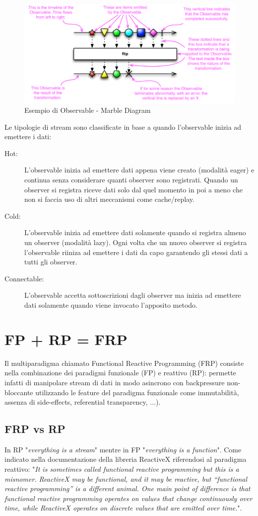 \documentclass[../main.tex]{subfiles}
\begin{document}
\begin{figure}[H]
\centering
\includegraphics[width=1\textwidth]{img/observable1.png}
\caption{Esempio di Observable - Marble Diagram}
\end{figure}

Le tipologie di stream sono classificate in base a quando l'observable inizia ad emettere i dati:
\begin{description}
    \item[Hot:] L'observable inizia ad emettere dati appena viene creato (modalità eager) e continua senza considerare quanti observer sono registrati. Quando un observer si registra riceve dati solo dal quel momento in poi a meno che non si faccia uso di altri meccanismi come cache/replay.
    \item[Cold:] L'observable inizia ad emettere dati solamente quando si registra almeno un observer (modalità lazy). Ogni volta che un nuovo observer si registra l'observable riiniza ad emettere i dati da capo garantendo gli stessi dati a tutti gli observer.
    \item[Connectable:] L'observable accetta sottoscrizioni dagli observer ma inizia ad emettere dati solamente quando viene invocato l'apposito metodo.
\end{description}

\section{FP + RP = FRP}
Il multiparadigma chiamato Functional Reactive Programming (FRP) consiste nella combinazione dei paradigmi funzionale (FP) e reattivo (RP): permette infatti di manipolare stream di dati in modo asincrono con backpressure non-bloccante utilizzando le feature del paradigma funzionale come immutabilità, assenza di side-effects, referential transparency, ...).

\subsection{FRP vs RP}
In RP "\textit{everything is a stream}" mentre in FP "\textit{everything is a function}". Come indicato nella documentazione della libreria ReactiveX riferendosi al paradigma reattivo: "\textit{It is sometimes called functional reactive programming but this is a misnomer. ReactiveX may be functional, and it may be reactive, but “functional reactive programming” is a different animal. One main point of difference is that functional reactive programming operates on values that change continuously over time, while ReactiveX operates on discrete values that are emitted over time.}".
\end{document}
